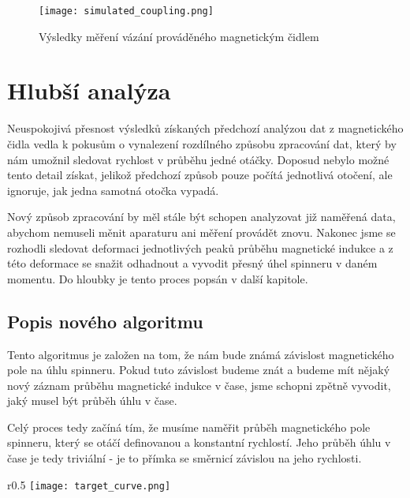 \begin{figure}[!ht]
    \texttt{[image: simulated\_coupling.png]}
    \centering
    \caption{Výsledky měření vázání prováděného magnetickým čidlem}
    \label{fig:mag_coupling_vernier}
\end{figure}

\section{Hlubší analýza}

Neuspokojivá přesnost výsledků získaných předchozí analýzou dat z magnetického čidla vedla k pokusům o vynalezení rozdílného způsobu zpracování dat, který by nám umožnil sledovat rychlost v průběhu jedné otáčky. Doposud nebylo možné tento detail získat, jelikož předchozí způsob pouze počítá jednotlivá otočení, ale ignoruje, jak jedna samotná otočka vypadá.

Nový způsob zpracování by měl stále být schopen analyzovat již naměřená data, abychom nemuseli měnit aparaturu ani měření provádět znovu. Nakonec jsme se rozhodli sledovat deformaci jednotlivých peaků průběhu magnetické indukce a z této deformace se snažit odhadnout a vyvodit přesný úhel spinneru v daném momentu. Do hloubky je tento proces popsán v další kapitole.

\clearpage
\subsection{Popis nového algoritmu}

Tento algoritmus je založen na tom, že nám bude známá závislost magnetického pole na úhlu spinneru. Pokud tuto závislost budeme znát a budeme mít nějaký nový záznam průběhu magnetické indukce v čase, jsme schopni zpětně vyvodit, jaký musel být průběh úhlu v čase.

Celý proces tedy začíná tím, že musíme naměřit průběh magnetického pole spinneru, který se otáčí definovanou a konstantní rychlostí. Jeho průběh úhlu v čase je tedy triviální - je to přímka se směrnicí závislou na jeho rychlosti.

\begin{wrapfigure}{r}{0.5\textwidth}
    \texttt{[image: target\_curve.png]}
    \centering
    \caption{}
    \label{fig:target_curve}
\end{wrapfigure}

